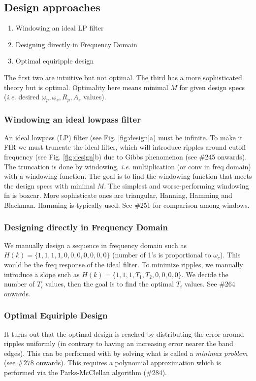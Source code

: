 \documentclass{article}
\newcommand{\ie}{\textit{i.e. }}
\begin{document}
\subsection{Design approaches}
\begin{enumerate}
\item Windowing an ideal LP filter
\item Designing directly in Frequency Domain
\item Optimal equiripple design
\end{enumerate}

The first two are intuitive but not optimal. The third has a more sophisticated theory but is optimal. Optimality here means minimal $M$ for given design specs (\ie desired $\omega_p, \omega_s, R_p, A_s$ values).

\subsubsection{Windowing an ideal lowpass filter}
An ideal lowpass (LP) filter (see Fig. \ref{fig:design}a) must be infinite. To make it FIR we must truncate the ideal filter, which will introduce ripples around cutoff frequency (see Fig. \ref{fig:design}b) due to Gibbs phenomenon (see \#245 onwards). The truncation is done by windowing, \ie multiplication (or conv in freq domain) with a windowing function. The goal  is to find the windowing function that meets the design specs with minimal $M$. The simplest and worse-performing windowing fn is boxcar. More sophisticate ones are triangular, Hanning, Hamming and Blackman. Hamming is typically used. See \#251 for comparison among windows.

\subsubsection{Designing directly in Frequency Domain}
We manually design a sequence in frequency domain such as $H(k) = \{1,1,1,1,0,0,0,0,0,0,0\}$ (number of 1's is proportional to $\omega_c$). This would be the freq response of the ideal filter. To minimize ripples, we manually introduce a slope such as $H(k) = \{1,1,1,T_1,T_2,0,0,0,0\}$. We decide the number of $T_i$ values, then the goal is to find the optimal $T_i$ values. See \#264 onwards.

\subsubsection{Optimal Equiriple Design}
It turns out that the optimal design is reached by distributing the error around ripples uniformly (in contrary to having an increasing error nearer the band edges). This can be performed with by solving what is called a \textit{minimax problem} (see \#278 onwards). This requires a polynomial approximation which is performed via the Parks-McClellan algorithm (\#284). 
\end{document}

